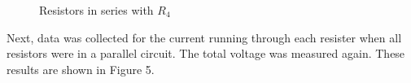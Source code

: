 \documentclass [12pt, letterpaper, twoside] {article}
\begin{document}
\begin{figure}
  \centering
  \qquad
  \caption{Resistors in series with \(R_{4}\)}
\end{figure}
    
Next, data was collected for the current running through each resister when all resistors were in a parallel circuit. The total voltage was measured again. These results are shown in Figure 5.
\end{document}
